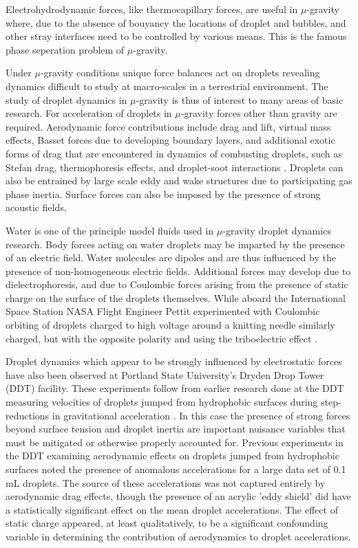 \documentclass{jfm}
\begin{document}
Electrohydrodynamic forces, like thermocapillary forces, are useful in $\mu$-gravity where, due to the absence of bouyancy the locations of droplet and bubbles, and other stray interfaces need to be controlled by various means. This is the famous phase seperation problem of $\mu$-gravity.

Under $\mu$-gravity conditions unique force balances act on droplets revealing dynamics difficult to study at macro-scales in a terrestrial environment. The study of droplet dynamics in $\mu$-gravity is thus of interest to many areas of basic research. For acceleration of droplets in $\mu$-gravity forces other than gravity are required. Aerodynamic force contributions include drag and lift, virtual mass effects, Basset forces due to developing boundary layers, and additional exotic forms of drag that are encountered in dynamics of combusting droplets, such as Stefan drag, thermophoresis effects, and droplet-soot interactions \cite{Manzello:2004dg}. Droplets can also be entrained by large scale eddy and wake structures due to participating gas phase inertia. Surface forces can also be imposed by the presence of strong acoustic fields.

Water is one of the principle model fluids used in $\mu$-gravity droplet dynamics research. Body forces acting on water droplets may be imparted by the presence of an electric field. Water molecules are dipoles and are thus influenced by the presence of non-homogeneous electric fields. Additional forces may develop due to dielectrophoresis, and due to Coulombic forces arising from the presence of static charge on the surface of the droplets themselves. While aboard the International Space Station NASA Flight Engineer Pettit experimented with Coulombic orbiting of droplets charged to high voltage around a knitting needle similarly charged, but with the opposite polarity and using the triboelectric effect \cite{Stevenson:2015dg}.

Droplet dynamics which appear to be strongly influenced by electrostatic forces have also been observed at Portland State University's Dryden Drop Tower (DDT) facility. These experiments follow from earlier research done at the DDT measuring velocities of droplets jumped from hydrophobic surfaces during step-reductions in gravitational acceleration \cite{Attari:2015dg}. In this case the presence of strong forces beyond surface tension and droplet inertia are important nuisance variables that must be mitigated or otherwise properly accounted for. Previous experiments in the DDT examining aerodynamic effects on droplets jumped from hydrophobic surfaces noted the presence of anomalous accelerations for a large data set of 0.1 mL droplets. The source of these accelerations was not captured entirely by aerodynamic drag effects, though the presence of an acrylic 'eddy shield' did have a statistically significant effect on the mean droplet accelerations. The effect of static charge appeared, at least qualitatively, to be a significant confounding variable in determining the contribution of aerodynamics to droplet accelerations.
\end{document}

